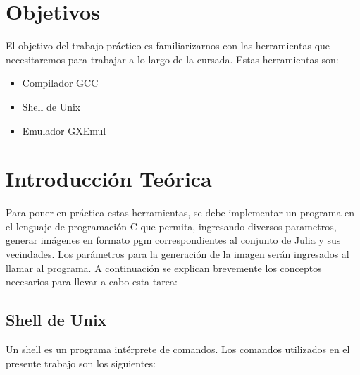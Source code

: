  

\pagestyle{empty} %

\titleGP %

\newpage

\pagestyle{plain}

\section{Objetivos}
	El objetivo del trabajo práctico es familiarizarnos con las herramientas que necesitaremos para trabajar a lo largo de la cursada. Estas herramientas son:
	\begin{itemize}
	  \item Compilador GCC
	  \item Shell de Unix
	  \item Emulador GXEmul
	\end{itemize}

\section{Introducción Teórica}
  \label{sec:InfoTeo}
  Para poner en práctica estas herramientas, se debe implementar un programa en el lenguaje de programación C que permita, ingresando diversos parametros,
  generar imágenes en formato pgm correspondientes al conjunto de Julia y sus vecindades. Los parámetros para la generación de la imagen serán ingresados 
  al llamar al programa.
  A continuación se explican brevemente los conceptos necesarios para llevar a cabo esta tarea:

  \vspace{0.5cm}
	\subsection{Shell de Unix}
	  Un shell es un programa intérprete de comandos. Los comandos utilizados en el presente trabajo
	  son los siguientes:

